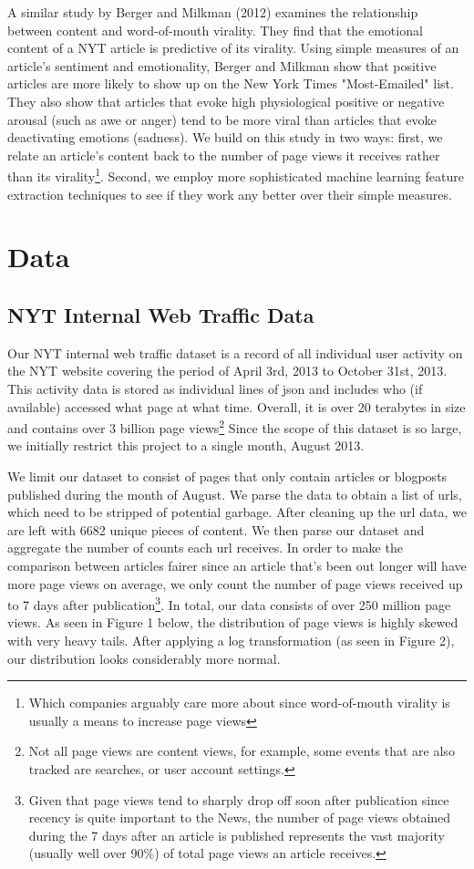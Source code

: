 \documentclass[fleqn,12pt]{SelfArx} %
\begin{document}
A similar study by Berger and Milkman (2012) \cite{berger2012makes} examines the relationship between content and word-of-mouth virality. They find that the emotional content of a NYT article is predictive of its virality. Using simple measures of an article's sentiment and emotionality, Berger and Milkman show that positive articles are more likely to show up on the New York Times "Most-Emailed" list. They also show that articles that evoke high physiological positive or negative arousal (such as awe or anger) tend to be more viral than articles that evoke deactivating emotions (sadness). We build on this study in two ways: first, we relate an article's content back to the number of page views it receives rather than its virality\footnote{Which companies arguably care more about since word-of-mouth virality is usually a means to increase page views}. Second, we employ more sophisticated machine learning feature extraction techniques to see if they work any better over their simple measures.

\section{Data}
\subsection{NYT Internal Web Traffic Data}
Our NYT internal web traffic dataset is a record of all individual user activity on the NYT website covering the period of April 3rd, 2013 to October 31st, 2013. This activity data is stored as individual lines of json and includes who (if available) accessed what page at what time. Overall, it is over 20 terabytes in size and contains over 3 billion page views\footnote{Not all page views are content views, for example, some events that are also tracked are searches, or user account settings.} Since the scope of this dataset is so large, we initially restrict this project to a single month, August 2013. 

We limit our dataset to consist of pages that only contain articles or blogposts published during the month of August. We parse the data to obtain a list of urls, which need to be stripped of potential garbage. After cleaning up the url data, we are left with 6682 unique pieces of content. We then parse our dataset and aggregate the number of counts each url receives. In order to make the comparison between articles fairer since an article that's been out longer will have more page views on average, we only count the number of page views received up to 7 days after publication\footnote{Given that page views tend to sharply drop off soon after publication since recency is quite important to the News, the number of page views obtained during the 7 days after an article is published represents the vast majority (usually well over 90\%) of total page views an article receives.}. In total, our data consists of over 250 million page views. As seen in Figure 1 below, the distribution of page views is highly skewed with very heavy tails. After applying a log transformation (as seen in Figure 2), our distribution looks considerably more normal. 
\end{document}
